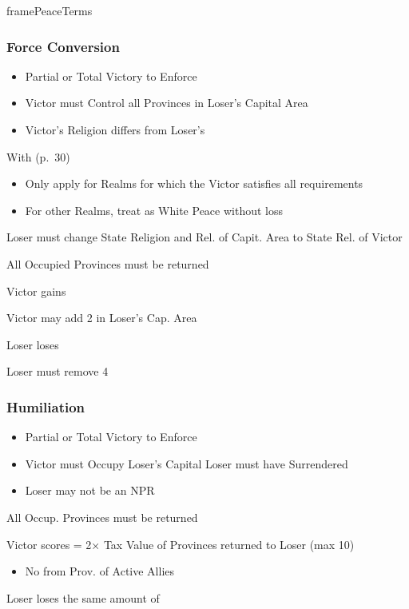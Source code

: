 \documentclass[10pt]{article}
\newlength{\fhPeaceTerms} \setlength\fhPeaceTerms{45.5\baselineskip}
\begin{document}
\begin{dynamiccontents*}{framePeaceTerms}
\begin{eubox}{\fhPeaceTerms}
\begin{multicols}{3}
		\subsubsection*{Force Conversion}
		\begin{itemize}
			{
				\color{peaceReqColor}
				\item {}
				\begin{itemize}
					\item Partial or Total Victory to Enforce
					\item Victor must Control all Provinces in Loser's Capital Area
					\item Victor's Religion differs from Loser's
				\end{itemize}
			}
			\item With  (p.~30)
			\begin{itemize}
				\item Only apply for Realms for which the Victor satisfies all requirements
				\item For other Realms, treat as White Peace without \prestige loss
			\end{itemize}
			\item Loser must change State Religion and Rel. of Capit. Area to State Rel. of Victor
			\item All Occupied Provinces must be returned
			\item Victor gains 
			\item Victor may add 2 \influence in Loser's Cap. Area
			\item Loser loses 
			\item Loser must remove 4 \influence
		\end{itemize}

		\subsubsection*{Humiliation}
		\begin{itemize}
			{
				\color{peaceReqColor}
				\item \strong{Requirements}
				\begin{itemize}
					\item Partial or Total Victory to Enforce
					\item Victor must Occupy Loser's Capital  Loser must have Surrendered
					\item Loser may not be an NPR
				\end{itemize}
			}
			\item All Occup. Provinces must be returned
			\item Victor scores \prestige = 2× Tax Value of Provinces returned to Loser (max 10)
			\begin{itemize}
				\item No \prestige from Prov. of Active Allies
			\end{itemize}
			\item Loser loses the same amount of \prestige
		\end{itemize}


\end{multicols}
\end{eubox}
\end{dynamiccontents*}
\end{document}
